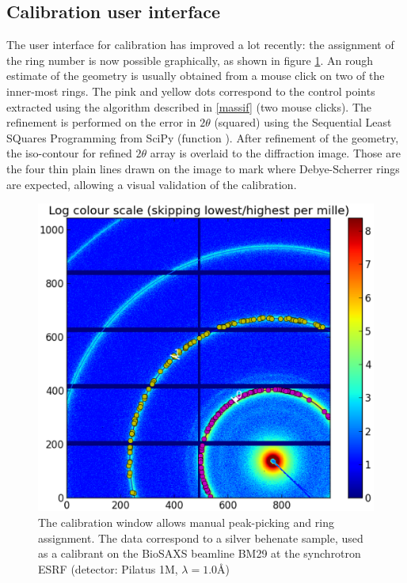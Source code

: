 \documentclass[preprint]{iucr}
\begin{document}
\subsection{Calibration user interface}

The user interface for calibration has improved a lot recently: the assignment
of the ring number is now possible graphically, as shown in figure \ref{calib}.
An rough estimate of the geometry is usually obtained from a mouse click on 
two of the inner-most rings. 
The pink and yellow dots correspond to the control points extracted using
the algorithm described in \ref{massif} (two mouse clicks).
The refinement is performed on the error in $2\theta$ (squared) using the 
Sequential Least SQuares Programming  from
SciPy (function ).
After refinement of the geometry, the iso-contour for refined $2\theta$ array is
overlaid to the diffraction image. Those are the four thin plain lines drawn on
the image to mark where Debye-Scherrer rings are expected, allowing a visual 
validation of the calibration.

\begin{figure}
\label{calib}
\begin{center}
\includegraphics[width=15cm]{calib.eps}
\caption{The calibration window allows manual peak-picking and
ring assignment. The data correspond to a silver behenate sample, used as a
calibrant on the BioSAXS beamline BM29 at the synchrotron ESRF
(detector: Pilatus 1M, $\lambda=1.0${\AA})}
\end{center}
\end{figure}
\end{document}
